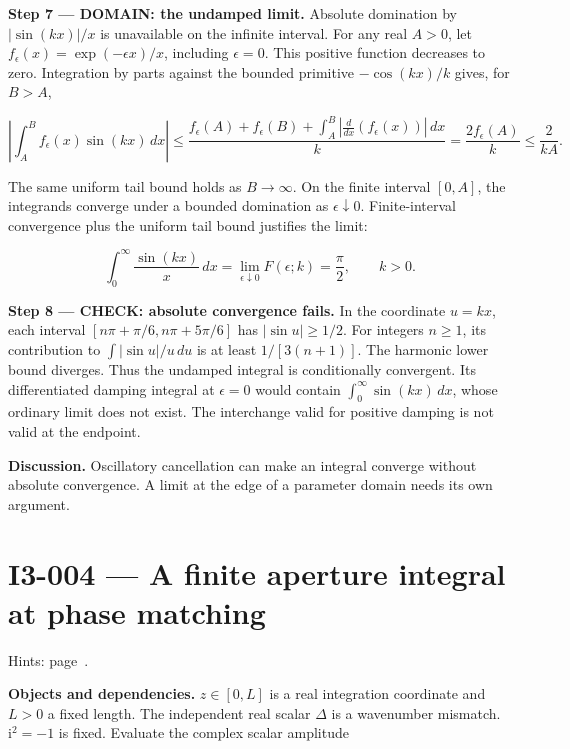 \documentclass[11pt,oneside,openany]{book}
\begin{document}
\endgroup
\begin{DomainStep}
\textbf{Step 7 --- DOMAIN: the undamped limit.} Absolute domination by \(|\sin(kx)|/x\) is unavailable on the infinite interval. For any real \(A>0\), let \(f_\epsilon(x)=\exp(-\epsilon x)/x\), including \(\epsilon=0\). This positive function decreases to zero. Integration by parts against the bounded primitive \(-\cos(kx)/k\) gives, for \(B>A\),

\[
\left|\int_A^B f_\epsilon(x)\sin(kx)\,dx\right|
\le\frac{f_\epsilon(A)+f_\epsilon(B)+\int_A^B|\frac{d}{dx}(f_\epsilon(x))|\,dx}{k}
=\frac{2f_\epsilon(A)}{k}\le\frac{2}{kA}.
\]

The same uniform tail bound holds as \(B\to\infty\). On the finite interval \([0,A]\), the integrands converge under a bounded domination as \(\epsilon\downarrow0\). Finite-interval convergence plus the uniform tail bound justifies the limit:

\[
\int_0^\infty\frac{\sin(kx)}{x}\,dx
=\lim_{\epsilon\downarrow0}F(\epsilon;k)=\frac{\pi}{2},\qquad k>0.
\]

\end{DomainStep}
\textbf{Step 8 --- CHECK: absolute convergence fails.} In the coordinate \(u=kx\), each interval \([n\pi+\pi/6,n\pi+5\pi/6]\) has \(|\sin u|\ge1/2\). For integers \(n\ge1\), its contribution to \(\int|\sin u|/u\,du\) is at least \(1/[3(n+1)]\). The harmonic lower bound diverges. Thus the undamped integral is conditionally convergent. Its differentiated damping integral at \(\epsilon=0\) would contain \(\int_0^\infty\sin(kx)\,dx\), whose ordinary limit does not exist. The interchange valid for positive damping is not valid at the endpoint.

\textbf{Discussion.} Oscillatory cancellation can make an integral converge without absolute convergence. A limit at the edge of a parameter domain needs its own argument.
\clearpage
\section{I3-004 --- A finite aperture integral at phase matching}
\label{problem:I3-004}
{\small Hints: page~\pageref{hints:I3-004}.}\par\medskip

\textbf{Objects and dependencies.} \(z\in[0,L]\) is a real integration coordinate and \(L>0\) a fixed length. The independent real scalar \(\Delta\) is a wavenumber mismatch. \(\mathrm{i}^2=-1\) is fixed. Evaluate the complex scalar amplitude
\end{document}
